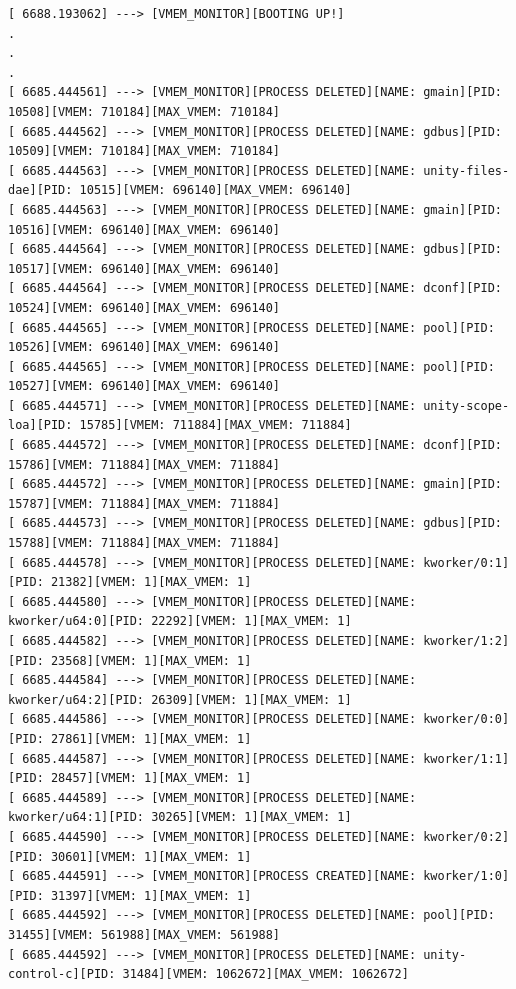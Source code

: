 \documentclass{article}
\begin{document}
\begin{latin}
\begin{verbatim}
[ 6688.193062] ---> [VMEM_MONITOR][BOOTING UP!]
.
.
.
[ 6685.444561] ---> [VMEM_MONITOR][PROCESS DELETED][NAME: gmain][PID: 10508][VMEM: 710184][MAX_VMEM: 710184]
[ 6685.444562] ---> [VMEM_MONITOR][PROCESS DELETED][NAME: gdbus][PID: 10509][VMEM: 710184][MAX_VMEM: 710184]
[ 6685.444563] ---> [VMEM_MONITOR][PROCESS DELETED][NAME: unity-files-dae][PID: 10515][VMEM: 696140][MAX_VMEM: 696140]
[ 6685.444563] ---> [VMEM_MONITOR][PROCESS DELETED][NAME: gmain][PID: 10516][VMEM: 696140][MAX_VMEM: 696140]
[ 6685.444564] ---> [VMEM_MONITOR][PROCESS DELETED][NAME: gdbus][PID: 10517][VMEM: 696140][MAX_VMEM: 696140]
[ 6685.444564] ---> [VMEM_MONITOR][PROCESS DELETED][NAME: dconf][PID: 10524][VMEM: 696140][MAX_VMEM: 696140]
[ 6685.444565] ---> [VMEM_MONITOR][PROCESS DELETED][NAME: pool][PID: 10526][VMEM: 696140][MAX_VMEM: 696140]
[ 6685.444565] ---> [VMEM_MONITOR][PROCESS DELETED][NAME: pool][PID: 10527][VMEM: 696140][MAX_VMEM: 696140]
[ 6685.444571] ---> [VMEM_MONITOR][PROCESS DELETED][NAME: unity-scope-loa][PID: 15785][VMEM: 711884][MAX_VMEM: 711884]
[ 6685.444572] ---> [VMEM_MONITOR][PROCESS DELETED][NAME: dconf][PID: 15786][VMEM: 711884][MAX_VMEM: 711884]
[ 6685.444572] ---> [VMEM_MONITOR][PROCESS DELETED][NAME: gmain][PID: 15787][VMEM: 711884][MAX_VMEM: 711884]
[ 6685.444573] ---> [VMEM_MONITOR][PROCESS DELETED][NAME: gdbus][PID: 15788][VMEM: 711884][MAX_VMEM: 711884]
[ 6685.444578] ---> [VMEM_MONITOR][PROCESS DELETED][NAME: kworker/0:1][PID: 21382][VMEM: 1][MAX_VMEM: 1]
[ 6685.444580] ---> [VMEM_MONITOR][PROCESS DELETED][NAME: kworker/u64:0][PID: 22292][VMEM: 1][MAX_VMEM: 1]
[ 6685.444582] ---> [VMEM_MONITOR][PROCESS DELETED][NAME: kworker/1:2][PID: 23568][VMEM: 1][MAX_VMEM: 1]
[ 6685.444584] ---> [VMEM_MONITOR][PROCESS DELETED][NAME: kworker/u64:2][PID: 26309][VMEM: 1][MAX_VMEM: 1]
[ 6685.444586] ---> [VMEM_MONITOR][PROCESS DELETED][NAME: kworker/0:0][PID: 27861][VMEM: 1][MAX_VMEM: 1]
[ 6685.444587] ---> [VMEM_MONITOR][PROCESS DELETED][NAME: kworker/1:1][PID: 28457][VMEM: 1][MAX_VMEM: 1]
[ 6685.444589] ---> [VMEM_MONITOR][PROCESS DELETED][NAME: kworker/u64:1][PID: 30265][VMEM: 1][MAX_VMEM: 1]
[ 6685.444590] ---> [VMEM_MONITOR][PROCESS DELETED][NAME: kworker/0:2][PID: 30601][VMEM: 1][MAX_VMEM: 1]
[ 6685.444591] ---> [VMEM_MONITOR][PROCESS CREATED][NAME: kworker/1:0][PID: 31397][VMEM: 1][MAX_VMEM: 1]
[ 6685.444592] ---> [VMEM_MONITOR][PROCESS DELETED][NAME: pool][PID: 31455][VMEM: 561988][MAX_VMEM: 561988]
[ 6685.444592] ---> [VMEM_MONITOR][PROCESS DELETED][NAME: unity-control-c][PID: 31484][VMEM: 1062672][MAX_VMEM: 1062672]

\end{verbatim}
\end{latin}
\end{document}
